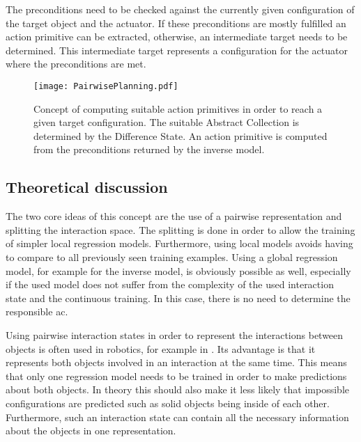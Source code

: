 The preconditions need to be checked against the currently given configuration of the target object and the actuator. If these preconditions are mostly fulfilled an action primitive can be extracted, otherwise, an intermediate target needs to be determined. This intermediate target represents a configuration for the actuator where the preconditions are met.

\begin{figure}
	\centering
	\texttt{[image: PairwisePlanning.pdf]}
	\caption{Concept of computing suitable action primitives in order to reach a given target configuration. The suitable Abstract Collection is determined by the Difference State. An action primitive is computed from the preconditions returned by the inverse model.} 
	\label{fig:PairPlanning}
\end{figure}


\subsection{Theoretical discussion}
The two core ideas of this concept are the use of a pairwise representation and splitting the interaction space. The splitting is done in order to allow the training of simpler local regression models. Furthermore, using local models avoids having to compare to all previously seen training examples. 
Using a global regression model, for example for the inverse model, is obviously possible as well, especially if the used model does not suffer from the complexity of the used interaction state and the continuous training. In this case, there is no need to determine the responsible \acrlong{ac}.

Using pairwise interaction states in order to represent the interactions between objects is often used in robotics, for example in \cite{pairwiseExamples}. 
Its advantage is that it represents both objects involved in an interaction at the same time. This means that only one regression model needs to be trained in order to make predictions about both objects. In theory this should also make it less likely that impossible configurations are predicted such as solid objects being inside of each other. Furthermore, such an interaction state can contain all the necessary information about the objects in one representation. 

